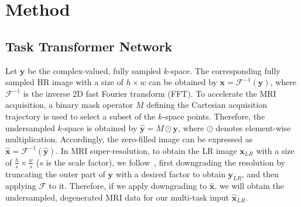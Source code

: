 \documentclass[runningheads]{llncs}
\begin{document}
\section{Method}
\subsection{Task Transformer Network}
Let $\mathbf{y}$ be the complex-valued, fully sampled $k$-space. The corresponding fully sampled HR image with a size of $h \times w$ can be obtained by $\mathbf{x}=\mathcal{F}^{-1}(\mathbf{y})$, where $\mathcal{F}^{-1}$ is the inverse 2D fast Fourier transform (FFT). To accelerate the MRI acquisition, a binary mask operator $M$ defining the Cartesian acquisition trajectory is used to select a subset of the $k$-space points. Therefore, the undersampled $k$-space is obtained by $\hat{\mathbf{y}}= M \odot \mathbf{y}$, where $\odot$ denotes element-wise multiplication. Accordingly, the zero-filled image can be  expressed as $\hat{\mathbf{x}}=\mathcal{F}^{-1}(\hat{\mathbf{y}})$. In MRI super-resolution, to obtain the LR image $\mathbf{x}_{LR}$ with a size of $\frac{h}{s}\!\times\!\frac{w}{s}$ ($s$ is the scale factor), we follow~\cite{chen2018efficient}, first downgrading the resolution by truncating the outer part of $\mathbf{y}$ with a desired factor to obtain $\mathbf{y}_{LR}$, and then applying $\mathcal{F}$ to it. Therefore, if we apply downgrading to $\hat{\mathbf{x}}$, we will obtain the undersampled, degenerated MRI data for our multi-task input $\hat{\mathbf{x}}_{LR}$.
\end{document}
